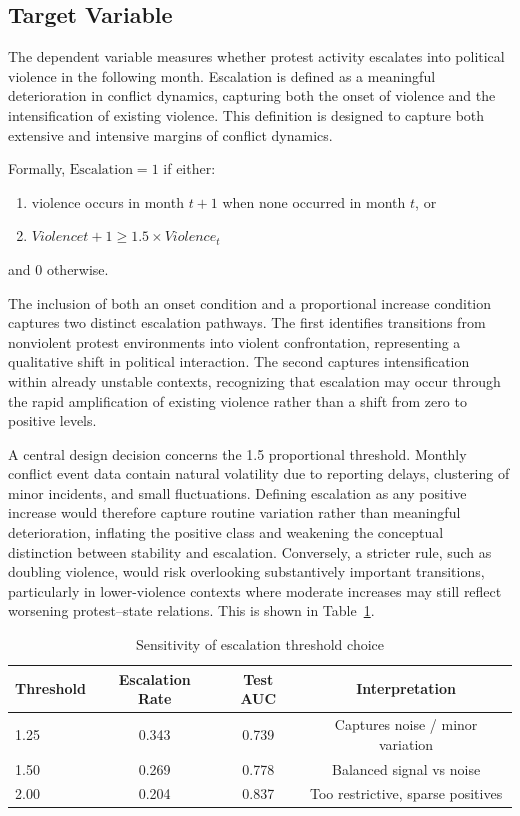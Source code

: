 \documentclass[12pt]{article}
\begin{document}
\subsection{Target Variable}

The dependent variable measures whether protest activity escalates into political violence in the following month. Escalation is defined as a meaningful deterioration in conflict dynamics, capturing both the onset of violence and the intensification of existing violence. This definition is designed to capture both extensive and intensive margins of conflict dynamics.

Formally, $\text{Escalation} = 1$ if either:
\begin{enumerate}
\item violence occurs in month $t+1$ when none occurred in month $t$, or
\item $Violence{t+1} \geq 1.5 \times Violence_t$
\end{enumerate}
and $0$ otherwise.

The inclusion of both an onset condition and a proportional increase condition captures two distinct escalation pathways. The first identifies transitions from nonviolent protest environments into violent confrontation, representing a qualitative shift in political interaction. The second captures intensification within already unstable contexts, recognizing that escalation may occur through the rapid amplification of existing violence rather than a shift from zero to positive levels.

A central design decision concerns the 1.5 proportional threshold. Monthly conflict event data contain natural volatility due to reporting delays, clustering of minor incidents, and small fluctuations. Defining escalation as any positive increase would therefore capture routine variation rather than meaningful deterioration, inflating the positive class and weakening the conceptual distinction between stability and escalation. Conversely, a stricter rule, such as doubling violence, would risk overlooking substantively important transitions, particularly in lower-violence contexts where moderate increases may still reflect worsening protest–state relations. This is shown in Table~\ref{tab:threshold_sensitivity}.

\begin{table}[H]
\centering
\caption{Sensitivity of escalation threshold choice}
\label{tab:threshold_sensitivity}
\begin{tabular}{lccc}
\toprule
Threshold & Escalation Rate & Test AUC & Interpretation \\
\midrule
1.25 & 0.343 & 0.739 & Captures noise / minor variation \\
1.50 & 0.269 & 0.778 & Balanced signal vs noise \\
2.00 & 0.204 & 0.837 & Too restrictive, sparse positives \\
\bottomrule
\end{tabular}
\end{table}
\end{document}
